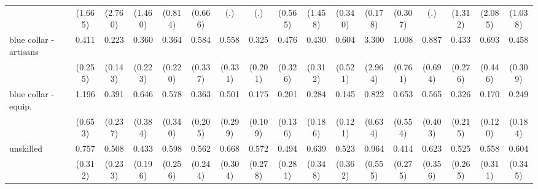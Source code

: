 {\begin{tabular}{l*{16}{c}}
                    &     (1.665)         &     (2.760)         &     (1.460)         &     (0.814)         &     (0.666)         &         (.)         &         (.)         &     (0.565)         &     (1.458)         &     (0.340)         &     (0.178)         &     (0.307)         &         (.)         &     (1.312)         &     (2.085)         &     (1.038)         \\
[1em]
blue collar - artisans&       0.411         &       0.223\sym{*}  &       0.360         &       0.364         &       0.584         &       0.558         &       0.325         &       0.476         &       0.430         &       0.604         &       3.300         &       1.008         &       0.887         &       0.433         &       0.693         &       0.458         \\
                    &     (0.255)         &     (0.143)         &     (0.223)         &     (0.220)         &     (0.337)         &     (0.331)         &     (0.201)         &     (0.326)         &     (0.312)         &     (0.521)         &     (2.964)         &     (0.761)         &     (0.694)         &     (0.276)         &     (0.446)         &     (0.309)         \\
[1em]
blue collar - equip.&       1.196         &       0.391         &       0.646         &       0.578         &       0.363         &       0.501         &       0.175\sym{**} &       0.201\sym{*}  &       0.284         &       0.145\sym{*}  &       0.822         &       0.653         &       0.565         &       0.326         &       0.170\sym{*}  &       0.249         \\
                    &     (0.653)         &     (0.237)         &     (0.384)         &     (0.340)         &     (0.205)         &     (0.299)         &     (0.109)         &     (0.136)         &     (0.186)         &     (0.121)         &     (0.634)         &     (0.554)         &     (0.403)         &     (0.215)         &     (0.120)         &     (0.184)         \\
[1em]
unskilled           &       0.757         &       0.508         &       0.433         &       0.598         &       0.562         &       0.668         &       0.572         &       0.494         &       0.639         &       0.523         &       0.964         &       0.414         &       0.623         &       0.525         &       0.558         &       0.604         \\
                    &     (0.312)         &     (0.233)         &     (0.196)         &     (0.256)         &     (0.244)         &     (0.304)         &     (0.278)         &     (0.281)         &     (0.348)         &     (0.362)         &     (0.555)         &     (0.275)         &     (0.356)         &     (0.265)         &     (0.311)         &     (0.345)         \\

\end{tabular}}
